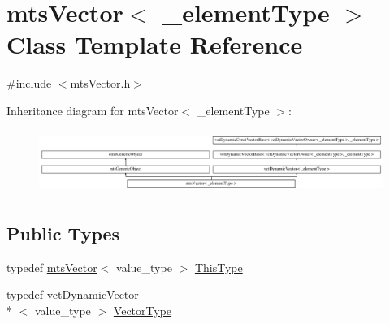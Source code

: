 \hypertarget{classmts_vector}{\section{mts\-Vector$<$ \-\_\-element\-Type $>$ Class Template Reference}
\label{classmts_vector}
}


{\ttfamily \#include $<$mts\-Vector.\-h$>$}

Inheritance diagram for mts\-Vector$<$ \-\_\-element\-Type $>$\-:\begin{figure}[H]
\begin{center}
\leavevmode
\includegraphics[height=2.077922cm]{db/dc0/classmts_vector}
\end{center}
\end{figure}
\subsection*{Public Types}
\begin{DoxyCompactItemize}
\item 
typedef \hyperlink{classmts_vector}{mts\-Vector}$<$ value\-\_\-type $>$ \hyperlink{classmts_vector_a39c230cdeada331a65d94ee6790611e4}{This\-Type}
\item 
typedef \hyperlink{classvct_dynamic_vector}{vct\-Dynamic\-Vector}\\*
$<$ value\-\_\-type $>$ \hyperlink{classmts_vector_a49432bef14e2c0e3d4d9786d4e1093c7}{Vector\-Type}
\end{DoxyCompactItemize}
